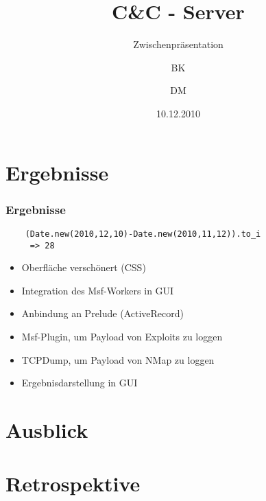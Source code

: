 \documentclass[authorinfoot]{fidius-p}
\author{BK \and DM}
\title{C\&C - Server}
\subtitle{Zwischenpräsentation}
\date{10.12.2010}
\begin{document}
\frame{\titlepage}
\frame{\tableofcontents}

\section{Ergebnisse}

\begin{frame}
  \frametitle{Ergebnisse}
  \begin{lstlisting}
    (Date.new(2010,12,10)-Date.new(2010,11,12)).to_i
     => 28
  \end{lstlisting}
  \begin{itemize}
   \item Oberfläche verschönert (CSS)
   \item Integration des Msf-Workers in GUI
   \item Anbindung an Prelude (ActiveRecord)
   \item Msf-Plugin, um Payload von Exploits zu loggen
   \item TCPDump, um Payload von NMap zu loggen
   \item Ergebnisdarstellung in GUI
  \end{itemize}

\end{frame}


\section{Ausblick}


\section{Retrospektive}
\end{document}
